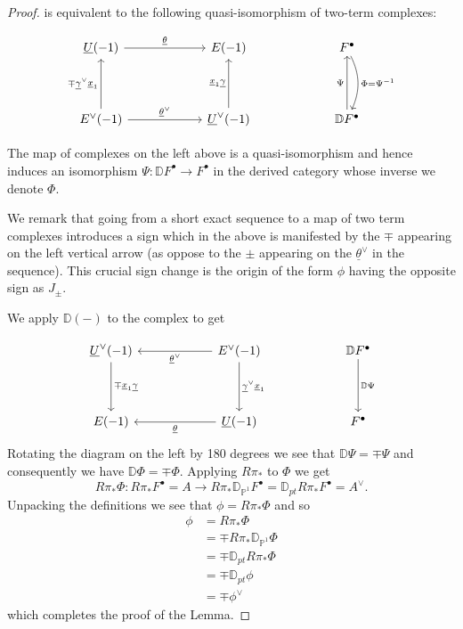 \documentclass{amsart}
\theoremstyle{definition}
\newcommand{\DD} {{\mathbb D}}
\newcommand{\PP}{\mathbb{P}}
\newcommand{\UL}[1]{\underline{#1}}
\newcommand{\Rpistar}{R\pi_{*}}
\begin{document}
\begin{proof}
is equivalent to the following quasi-isomorphism of two-term complexes:


\[
\begin{tikzcd}[column sep=6em,row sep=4em]
  \UL{U}(-1)
    \arrow[r,"\UL{\theta }"]
  & E(-1)
  & F^{\bullet}
    \arrow[d,bend left=25,"\Phi=\Psi^{-1}   "]\\
  E^{\vee}(-1)
    \arrow[u,"\mp \UL{\gamma}^{\vee}\UL{x}_{1}"]
    \arrow[r,"\UL{\theta }^{\vee}"]
  & \UL{U}^{\vee }(-1)
    \arrow[u,"\UL{x}_{1}\UL{\gamma }"]
  & \DD F^{\bullet}
    \arrow[u,"\Psi  "]
\end{tikzcd}
\]

The map of complexes on the left above is a quasi-isomorphism and
hence induces an isomorphism $\Psi :\DD F^{\bullet}\to F^{\bullet}$
in the derived category whose inverse we denote $\Phi$.

We remark that going from a short exact sequence to a map of two term
complexes introduces a sign which in the above is manifested by the
$\mp$ appearing on the left vertical arrow (as oppose to the $\pm$
appearing on the $\UL{\theta}^{\vee}$ in the sequence). This crucial
sign change is the origin of the form $\phi$ having the opposite sign
as $J_{\pm}$.

We apply $\DD (-)$ to the complex to get

\[
\begin{tikzcd}[column sep=6em,row sep=4em]
  \UL{U}^{\vee }(-1)
    \arrow[d,"\mp\UL{x}_{1} \UL{\gamma}"]
  & E^{\vee}(-1)
    \arrow[d,"\UL{\gamma }^{\vee } \UL{x}_{1}"]
    \arrow[l,"\UL{\theta }^{\vee}"]
  & \DD F^{\bullet}
    \arrow[d,"\DD \Psi  "]
  \\
  E(-1)
  & \UL{U}(-1)
    \arrow[l,"\UL{\theta }"]
  & F^{\bullet}
\end{tikzcd}
\]
Rotating the diagram on the left by 180 degrees we see that $\DD \Psi
=\mp \Psi$ and consequently we have $\DD \Phi =\mp \Phi$. Applying
$\Rpistar $ to $\Phi$ we get
\[
\Rpistar \Phi : \Rpistar F^{\bullet} = A \to \Rpistar
\DD_{\PP^{1}}F^{\bullet}=\DD_{pt}\Rpistar F^{\bullet} = A^{\vee}.
\]
Unpacking the definitions we see that $\phi  = \Rpistar \Phi$ and so
\begin{align*}
\phi &=\Rpistar \Phi \\
&=\mp \Rpistar \DD_{\PP^{1}}\Phi \\
&=\mp \DD_{pt}\Rpistar \Phi \\
&=\mp \DD_{pt}\phi \\
&=\mp \phi^{\vee}
\end{align*}
which completes the proof of the Lemma.
\end{proof}
 
\end{document}
